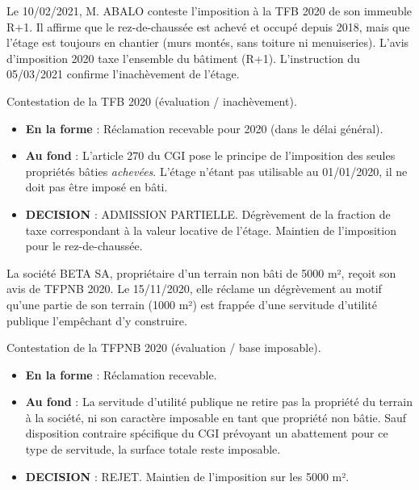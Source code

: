 \documentclass[a4paper, 11pt]{exam}
\begin{document}
	\begin{questions}
		
		
		\question Le 10/02/2021, M. ABALO conteste l'imposition à la TFB 2020 de son immeuble R+1. Il affirme que le rez-de-chaussée est achevé et occupé depuis 2018, mais que l'étage est toujours en chantier (murs montés, sans toiture ni menuiseries). L'avis d'imposition 2020 taxe l'ensemble du bâtiment (R+1). L'instruction du 05/03/2021 confirme l'inachèvement de l'étage.
		\begin{solution}
			Contestation de la TFB 2020 (évaluation / inachèvement).
			\begin{itemize}
				\item \textbf{En la forme} : Réclamation recevable pour 2020 (dans le délai général).
				\item \textbf{Au fond} : L'article 270 du CGI pose le principe de l'imposition des seules propriétés bâties \textit{achevées}. L'étage n'étant pas utilisable au 01/01/2020, il ne doit pas être imposé en bâti.
				\item \textbf{DECISION} : ADMISSION PARTIELLE. Dégrèvement de la fraction de taxe correspondant à la valeur locative de l'étage. Maintien de l'imposition pour le rez-de-chaussée.
			\end{itemize}
		\end{solution}
		
		\question La société BETA SA, propriétaire d'un terrain non bâti de 5000 m², reçoit son avis de TFPNB 2020. Le 15/11/2020, elle réclame un dégrèvement au motif qu'une partie de son terrain (1000 m²) est frappée d'une servitude d'utilité publique l'empêchant d'y construire.
		\begin{solution}
			Contestation de la TFPNB 2020 (évaluation / base imposable).
			\begin{itemize}
				\item \textbf{En la forme} : Réclamation recevable.
				\item \textbf{Au fond} : La servitude d'utilité publique ne retire pas la propriété du terrain à la société, ni son caractère imposable en tant que propriété non bâtie. Sauf disposition contraire spécifique du CGI prévoyant un abattement pour ce type de servitude, la surface totale reste imposable.
				\item \textbf{DECISION} : REJET. Maintien de l'imposition sur les 5000 m².
			\end{itemize}
		\end{solution}
		

\end{questions}
\end{document}
